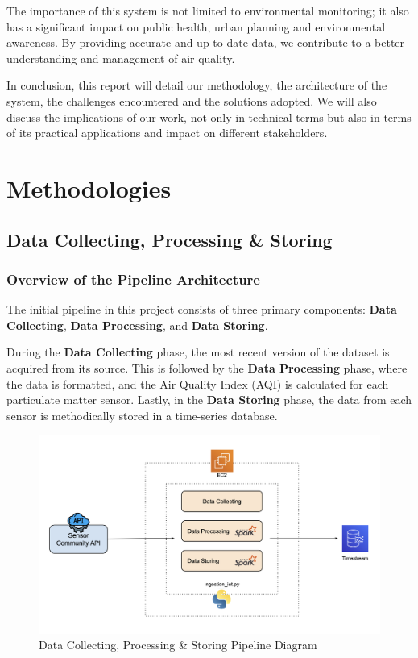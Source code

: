 \documentclass[12pt,oneside]{book} %
\begin{document}
The importance of this system is not limited to environmental monitoring; it
also has a significant impact on public health, urban planning and
environmental awareness. By providing accurate and up-to-date data, we
contribute to a better understanding and management of air quality.

In conclusion, this report will detail our methodology, the architecture of the
system, the challenges encountered and the solutions adopted. We will also
discuss the implications of our work, not only in technical terms but also in
terms of its practical applications and impact on different stakeholders.

\chapter{Methodologies}\label{chap:one}

\section{Data Collecting, Processing \& Storing}

\subsection{Overview of the Pipeline Architecture}

The initial pipeline in this project consists of three primary components:
\textbf{Data Collecting}, \textbf{Data Processing}, and \textbf{Data Storing}.

During the \textbf{Data Collecting} phase, the most recent version of the
dataset is acquired from its source. This is followed by the \textbf{Data
    Processing} phase, where the data is formatted, and the Air Quality Index (AQI)
is calculated for each particulate matter sensor. Lastly, in the \textbf{Data
    Storing} phase, the data from each sensor is methodically stored in a
time-series database.

\begin{figure}[H]
    \centering
    \includegraphics[width=1\linewidth]{images/cloud-computing-data-ingestion.png}
    \caption{Data Collecting, Processing \& Storing Pipeline Diagram}
\end{figure}
\end{document}
